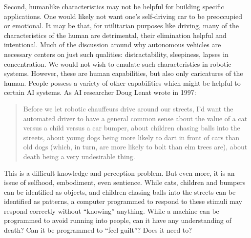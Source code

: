 Second, humanlike characteristics may not be helpful for building
specific applications. One would likely not want one's self-driving car
to be preoccupied or emotional.\cite{???-wiredFutureofAI} It may be that, for utilitarian
purposes like driving, many of the characteristics of the human are
detrimental, their elimination helpful and intentional. Much of the
discussion around why autonomous vehicles are necessary centers on
just such qualities: distractability, sleepiness, lapses in
concentration.\cite{???} We would not wish to emulate such
characteristics in robotic systems. However, these are human
capabilities, but also only caricatures of the human. People possess a
variety of other capabilities which might be helpful to certain AI
systems. As AI researcher Doug Lenat wrote in 1997:
\begin{quote}
Before we let robotic chauffeurs drive around our streets, I'd want the
  automated driver to have a general common sense about the value of a
cat versus a child versus a car bumper, about children chasing balls
into the streets, about young dogs being more likely to dart in front
of cars than old dogs (which, in turn, are more likely to bolt than
elm trees are), about death being a very undesirable thing.\cite[p.
  122]{ekbia}\end{quote} 

This is a difficult knowledge and perception problem. But even more,
it is an issue of selfhood, embodiment, even sentience. While cats,
children and bumpers can be identified as objects, and children
chasing balls into the streets can be identified as patterns, a
computer programmed to respond to these stimuli may respond correctly
without ``knowing'' anything. While a machine can be programmed to avoid
running into people, can it have any understanding of death? Can it be
programmed to ``feel guilt''? Does it need to?

